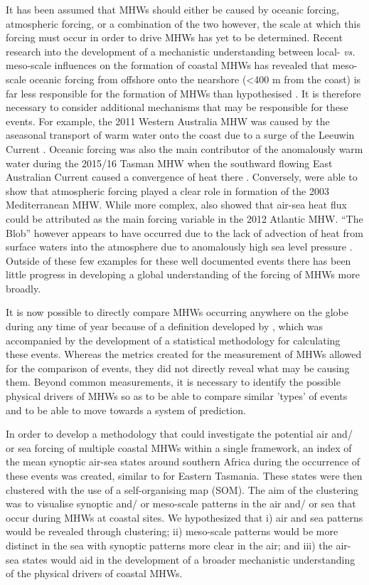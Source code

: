 \documentclass[a4paper,10pt,review]{elsarticle}
\begin{document}
It has been assumed that MHWs should either be caused by oceanic forcing, atmospheric forcing, or a combination of the two however, the scale at which this forcing must occur in order to drive MHWs has yet to be determined. Recent research into the development of a mechanistic understanding between local- \emph{vs.} meso-scale influences on the formation of coastal MHWs has revealed that meso-scale oceanic forcing from offshore onto the nearshore (<400 m from the coast) is far less responsible for the formation of MHWs than hypothesised \citep{Schlegel2017}. It is therefore necessary to consider additional mechanisms that may be responsible for these events. For example, the 2011 Western Australia MHW \citep{Pearce2013} was caused by the aseasonal transport of warm water onto the coast due to a surge of the Leeuwin Current \citep{Feng2013, Benthuysen2014}. Oceanic forcing was also the main contributor of the anomalously warm water during the 2015/16 Tasman MHW when the southward flowing East Australian Current caused a convergence of heat there \citep{Oliver2017}. Conversely, \citet{Garrabou2009} were able to show that atmospheric forcing played a clear role in formation of the 2003 Mediterranean MHW. While more complex, \citet{Chen2015a} also showed that air-sea heat flux could be attributed as the main forcing variable in the 2012 Atlantic MHW. ``The Blob'' however appears to have occurred due to the lack of advection of heat from surface waters into the atmosphere due to anomalously high sea level pressure \citep{Bond2015a}. Outside of these few examples for these well documented events there has been little progress in developing a global understanding of the forcing of MHWs more broadly.

It is now possible to directly compare MHWs occurring anywhere on the globe during any time of year because of a definition developed by \citet{Hobday2016}, which was accompanied by the development of a statistical methodology for calculating these events. Whereas the metrics created for the measurement of MHWs allowed for the comparison of events, they did not directly reveal what may be causing them. Beyond common measurements, it is necessary to identify the possible physical drivers of MHWs so as to be able to compare similar 'types' of events and to be able to move towards a system of prediction.

In order to develop a methodology that could investigate the potential air and/ or sea forcing of multiple coastal MHWs within a single framework, an index of the mean synoptic air-sea states around southern Africa during the occurrence of these events was created, similar to \citet{Oliver2017atlas} for Eastern Tasmania. These states were then clustered with the use of a self-organising map (SOM). The aim of the clustering was to visualise synoptic and/ or meso-scale patterns in the air and/ or sea that occur during MHWs at coastal sites. We hypothesized that i) air and sea patterns would be revealed through clustering; ii) meso-scale patterns would be more distinct in the sea with synoptic patterns more clear in the air; and iii) the air-sea states would aid in the development of a broader mechanistic understanding of the physical drivers of coastal MHWs.
\end{document}
